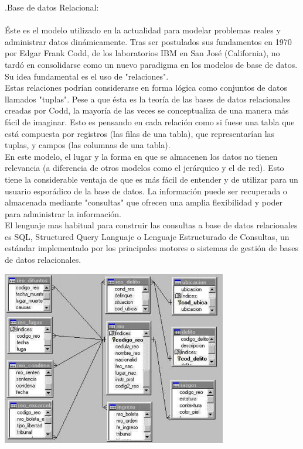 \documentclass[12pt,letterpaper]{article}
\begin{document}
.Base de datos Relacional: \\ \\
Éste es el modelo utilizado en la actualidad para modelar problemas reales y administrar datos dinámicamente. Tras ser postulados sus fundamentos en 1970 por Edgar Frank Codd, de los laboratorios IBM en San José (California), no tardó en consolidarse como un nuevo paradigma en los modelos de base de datos. Su idea fundamental es el uso de "relaciones".\\ Estas relaciones podrían considerarse en forma lógica como conjuntos de datos llamados "tuplas". Pese a que ésta es la teoría de las bases de datos relacionales creadas por Codd, la mayoría de las veces se conceptualiza de una manera más fácil de imaginar. Esto es pensando en cada relación como si fuese una tabla que está compuesta por registros (las
filas de una tabla), que representarían las tuplas, y campos (las columnas de una tabla).\\
En este modelo, el lugar y la forma en que se almacenen los datos no tienen relevancia (a diferencia de otros modelos como el jerárquico y el de red). Esto tiene la considerable ventaja de que es más fácil de entender y de utilizar para un usuario esporádico de la  base de datos. La información puede ser recuperada o almacenada mediante "consultas" que ofrecen una amplia flexibilidad y poder para administrar la información.\\
El lenguaje mas habitual para construir las consultas a base de datos relacionales es SQL, Structured Query Languaje o Lenguaje Estructurado de Consultas, un estándar implementado por los principales motores o sistemas de gestión de bases de datos relacionales. \\

\begin{center} 
\includegraphics[scale=1]{IMAGENES/relacional.png} 
\end{center}
\\
\end{document}
